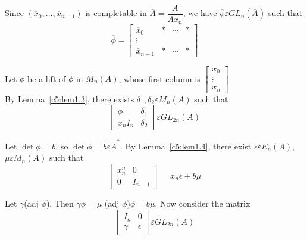 \begin{PRFF2}
Since $\left(\overline{x}_0,\ldots,\overline{x}_{n-1}\right)$ is
completable in $\overline{A}=\dfrac{A}{Ax_n}$, we have
$\overline{\phi}\varepsilon GL_n(\overline{A})$ such that 
$$
\overline{\phi}=
\begin{bmatrix}
\overline{x}_0 & \ast &\cdots & \ast\\
\vdots & & & \\
\overline{x}_{n-1} & \ast & \cdots & \ast
\end{bmatrix}
$$

Let $\phi$ be a lift of $\overline{\phi}$ in $M_n(A)$, whose first
column is $\begin{bmatrix}
x_0\\
\vdots\\
x_n
\end{bmatrix}$ \\By Lemma~\ref{c5:lem1.3}, there exists
$\delta_1,\delta_2\varepsilon M_n(A)$ such that 
$$
\begin{bmatrix}
\phi& \delta_1\\
x_nI_n & \delta_2
\end{bmatrix} \varepsilon GL_{2n}(A)
$$

Let $\det \phi=b$, so $\det \overline{\phi}=\overline{b}\varepsilon
\overline{A}^{\ast}$. By Lemma~\ref{c5:lem1.4}, there exist $\epsilon
\varepsilon E_n(A)$, $\mu \varepsilon M_n(A)$ such that 
$$
\begin{bmatrix}
x^{n}_n & 0\\
0 & I_{n-1}
\end{bmatrix} = x_n\epsilon +b\mu
$$

Let $\gamma$(adj $\phi$). Then $\gamma\phi=\mu$ (adj
$\phi$)$\phi=b\mu$. Now consider the matrix
$$
\begin{bmatrix}
I_n & 0\\
\gamma & \epsilon
\end{bmatrix} \varepsilon GL_{2n}(A)
$$


\end{PRFF2}
